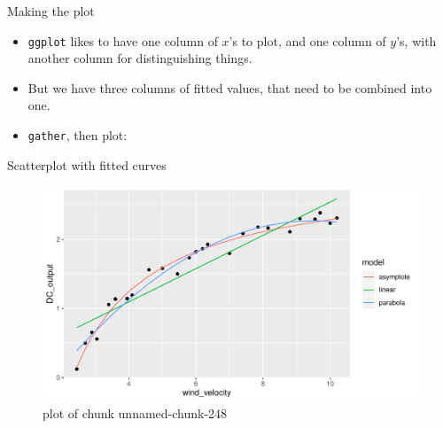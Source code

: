 \documentclass[ignorenonframetext,]{beamer}
\newenvironment{Shaded}{\begin{snugshade}}{\end{snugshade}}
\newcommand{\DataTypeTok}[1]{\textcolor[rgb]{0.13,0.29,0.53}{#1}}
\newcommand{\KeywordTok}[1]{\textcolor[rgb]{0.13,0.29,0.53}{\textbf{#1}}}
\newcommand{\NormalTok}[1]{#1}
\newcommand{\OperatorTok}[1]{\textcolor[rgb]{0.81,0.36,0.00}{\textbf{#1}}}
\newcommand{\StringTok}[1]{\textcolor[rgb]{0.31,0.60,0.02}{#1}}
\providecommand{\tightlist}{%
  \setlength{\itemsep}{0pt}\setlength{\parskip}{0pt}}
\begin{document}
\begin{frame}[fragile]{Making the plot}
\protect\hypertarget{making-the-plot}{}

\begin{itemize}
\tightlist
\item
  \texttt{ggplot} likes to have one column of \(x\)'s to plot, and one
  column of \(y\)'s, with another column for distinguishing things.
\item
  But we have three columns of fitted values, that need to be combined
  into one.
\item
  \texttt{gather}, then plot:
\end{itemize}

\begin{Shaded}
\end{Shaded}

\end{frame}

\begin{frame}{Scatterplot with fitted curves}
\protect\hypertarget{scatterplot-with-fitted-curves}{}

\begin{figure}
\centering
\includegraphics{figure/unnamed-chunk-248-1.pdf}
\caption{plot of chunk unnamed-chunk-248}
\end{figure}

\end{frame}
\end{document}
